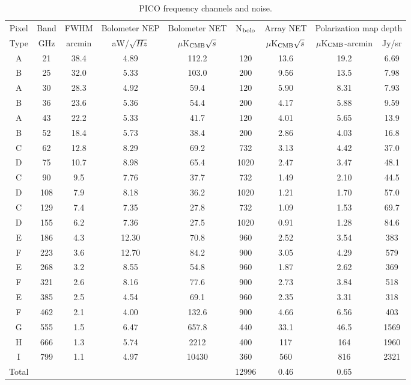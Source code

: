 \documentclass[]{spie}  %
\begin{document}
\begin{table}[ht]
\centering
\caption{PICO frequency channels and noise. }
\label{tab:noise}
\begin{tabular}{|c|c|c|c|c|c|c|cc|}
\hline
Pixel  & Band  & FWHM   & Bolometer NEP & Bolometer NET        & N$_{\rm bolo}$ & Array NET            & \multicolumn{2}{|c|}{Polarization map depth}  \\
Type   & GHz   & arcmin & aW/$\sqrt{Hz}$ & $\mu$K$_{\rm CMB}\sqrt{s}$ &           & $\mu$K$_{\rm CMB}\sqrt{s}$ & $\mu$K$_{\rm CMB}$-arcmin & Jy/sr     \\ \hline
A     & 21  & 38.4 & 4.89  & 112.2   & 120   & 13.6  & 19.2  & 6.69 \\
B     & 25  & 32.0 & 5.33  & 103.0   & 200   & 9.56   & 13.5 & 7.98  \\
A     & 30  & 28.3 & 4.92  & 59.4    & 120   & 5.90   & 8.31 & 7.93   \\
B     & 36  & 23.6 & 5.36  & 54.4    & 200   & 4.17   & 5.88 & 9.59   \\
A     & 43  & 22.2 & 5.33  & 41.7    & 120   & 4.01   & 5.65 & 13.9   \\
B     & 52  & 18.4 & 5.73  & 38.4    & 200   & 2.86   & 4.03 & 16.8   \\
C     & 62  & 12.8 & 8.29  & 69.2    & 732   & 3.13   & 4.42 & 37.0   \\
D     & 75  & 10.7 & 8.98  & 65.4    & 1020  & 2.47   & 3.47 & 48.1   \\
C     & 90  & 9.5  & 7.76  & 37.7    & 732   & 1.49   & 2.10 & 44.5   \\
D     & 108 & 7.9  & 8.18  & 36.2    & 1020  & 1.21   & 1.70 & 57.0   \\
C     & 129 & 7.4  & 7.35  & 27.8    & 732   & 1.09   & 1.53 & 69.7   \\
D     & 155 & 6.2  & 7.36  & 27.5    & 1020  & 0.91   & 1.28 & 84.6   \\
E     & 186 & 4.3  & 12.30 & 70.8    & 960   & 2.52   & 3.54 & 383    \\
F     & 223 & 3.6  & 12.70 & 84.2    & 900   & 3.05   & 4.29 & 579    \\
E     & 268 & 3.2  & 8.55  & 54.8    & 960   & 1.87   & 2.62 & 369    \\
F     & 321 & 2.6  & 8.16  & 77.6    & 900   & 2.73   & 3.84 & 518    \\
E     & 385 & 2.5  & 4.54  & 69.1    & 960   & 2.35   & 3.31 & 318    \\
F     & 462 & 2.1  & 4.00  & 132.6   & 900   & 4.66   & 6.56 & 403    \\
G     & 555 & 1.5  & 6.47  & 657.8   & 440   & 33.1   & 46.5 & 1569  \\
H     & 666 & 1.3  & 5.74  & 2212    & 400   & 117    & 164  & 1960 \\
I     & 799 & 1.1  & 4.97  & 10430   & 360   & 560    & 816  & 2321 \\ 
\hline
Total &     &      &       &         & 12996 & 0.46   & 0.65 &   \\
\hline
\end{tabular}
\end{table}
\end{document}
